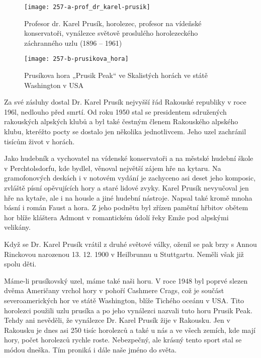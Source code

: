 \documentclass[../dejiny-rodu-prusiku.tex]{subfiles}
\begin{document}
\begin{figure}
\centering
\texttt{[image: 257-a-prof\_dr\_karel-prusik]}
\caption{Profesor dr. Karel Prusík, horolezec, profesor na vídeňské konservatoři, vynálezce světově proslulého horolezeckého záchranného uzlu (1896 – 1961)}
\label{fig:257-a-prof_dr_karel-prusik}
\end{figure}

             \begin{figure}
\centering
\texttt{[image: 257-b-prusikova\_hora]}
\caption{Prusíkova hora „Prusik Peak“ ve Skalistých horách ve státě Washington v USA}
\label{fig:257-b-prusikova_hora}
\end{figure}

Za své zásluhy dostal Dr. Karel Prusík nejvyšší řád Rakouské republiky v roce 196l, nedlouho před smrtí. Od roku 1950 stal se presidentem sdružených rakouských alpských klubů a byl také čestným členem Rakouského alpského klubu, kteréžto pocty se dostalo jen několika jednotlivcem. Jeho uzel zachránil tisícům život v horách.

Jako hudebník a vychovatel na vídenské konservatoři a na městské hudební škole v Perchtolsdorfu, kde bydlel, věnoval největší zájem hře na kytaru. Na gramofonových deskách i v notovém vydání je zachyceno asi deset jeho komposic, zvláště písní opěvujících hory a staré lidové zvyky. Karel Prusík nevyučoval jen hře na kytaře, ale i na housle a jiné hudební nástroje. Napsal také kromě mnoha básní i román Faust a hora. Z jeho podnětu byl zřízen pamětní hřbitov obětem hor blíže kláštera Admont v romantickém údolí řeky Emže pod alpskými velikány.

Když se Dr. Karel Prusík vrátil z druhé světové války, oženil se pak brzy s Annou Rinckovou narozenou 13. 12. 1900 v Heilbrunnu u Stuttgartu. Neměli však již spolu děti.

Máme-li prusíkovský uzel, máme také naši horu. V roce 1948 byl poprvé slezen dvěma Američany vrchol hory v pohoří Cashmere Crags, což je součást severoamerických hor ve státě Washington, blíže  Tichého oceánu v USA. Tito horolezci použili uzlu prusíka a po jeho vynálezci nazvali tuto horu Prusik Peak. Tehdy ani nevěděli, že vynálezce Dr. Karel Prusík žije v Rakousku. Jen v Rakousku je dnes asi 250 tisíc horolezců a také u nás a ve všech zemích, kde mají hory, počet horolezců rychle roste. Nebezpečný, ale krásný tento sport stal se módou dneška. Tím proniká i dále naše jméno do světa.
\end{document}
